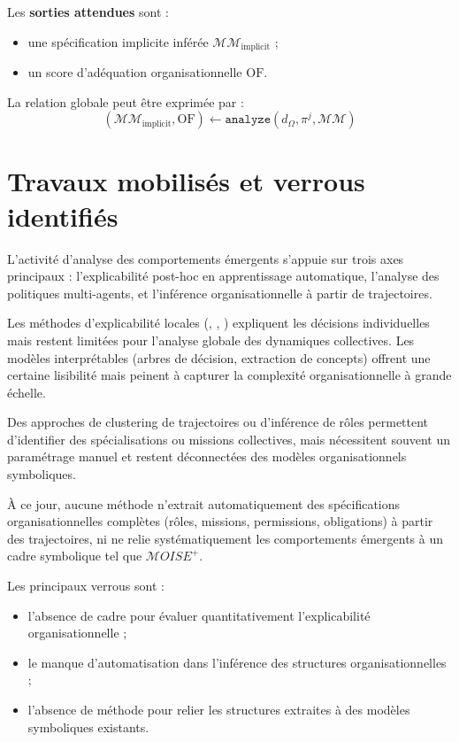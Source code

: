 Les \textbf{sorties attendues} sont :
\begin{itemize}
    \item une spécification implicite inférée $\mathcal{MM}_{\text{implicit}}$ ;
    \item un score d’adéquation organisationnelle $\text{OF}$.
\end{itemize}

\noindent La relation globale peut être exprimée par :
\[
    (\mathcal{MM}_{\text{implicit}}, \text{OF}) \gets \texttt{analyze}(d_\Omega, \pi^j, \mathcal{MM})
\]


\section{Travaux mobilisés et verrous identifiés}

L’activité d’analyse des comportements émergents s’appuie sur trois axes principaux : l’explicabilité post-hoc en apprentissage automatique, l’analyse des politiques multi-agents, et l’inférence organisationnelle à partir de trajectoires.

Les méthodes d’explicabilité locales (, , ) expliquent les décisions individuelles mais restent limitées pour l’analyse globale des dynamiques collectives. Les modèles interprétables (arbres de décision, extraction de concepts) offrent une certaine lisibilité mais peinent à capturer la complexité organisationnelle à grande échelle.

Des approches de clustering de trajectoires ou d’inférence de rôles permettent d’identifier des spécialisations ou missions collectives, mais nécessitent souvent un paramétrage manuel et restent déconnectées des modèles organisationnels symboliques.

À ce jour, aucune méthode n’extrait automatiquement des spécifications organisationnelles complètes (rôles, missions, permissions, obligations) à partir des trajectoires, ni ne relie systématiquement les comportements émergents à un cadre symbolique tel que $\mathcal{M}OISE^+$.

Les principaux verrous sont :
\begin{itemize}
    \item l’absence de cadre pour évaluer quantitativement l’explicabilité organisationnelle ;
    \item le manque d’automatisation dans l’inférence des structures organisationnelles ;
    \item l’absence de méthode pour relier les structures extraites à des modèles symboliques existants.
\end{itemize}

